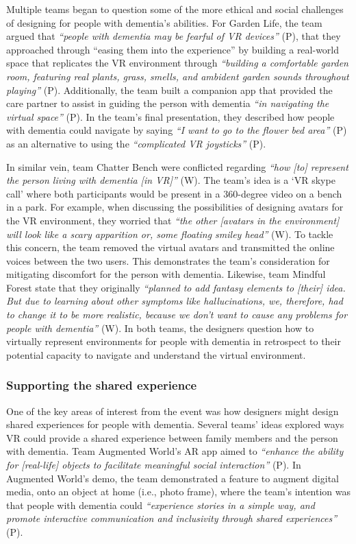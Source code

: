 Multiple teams began to question some of the more ethical and social challenges of designing for people with dementia’s abilities. For Garden Life, the team argued that \textit{``people with dementia may be fearful of VR devices''} (P), that they approached through “easing them into the experience” by building a real-world space that replicates the VR environment through \textit{``building a comfortable garden room, featuring real plants, grass, smells, and ambident garden sounds throughout playing''} (P). Additionally, the team built a companion app that provided the care partner to assist in guiding the person with dementia \textit{``in navigating the virtual space''} (P). In the team’s final presentation, they described how people with dementia could navigate by saying \textit{``I want to go to the flower bed area''} (P) as an alternative to using the \textit{``complicated VR joysticks'' }(P). 

In similar vein, team Chatter Bench were conflicted regarding \textit{``how [to] represent the person living with dementia [in VR]''} (W). The team's idea is a `VR skype call' where both participants would be present in a 360-degree video on a bench in a park. For example, when discussing the possibilities of designing avatars for the VR environment, they worried that \textit{``the other [avatars in the environment] will look like a scary apparition or, some floating smiley head''} (W). To tackle this concern, the team removed the virtual avatars and transmitted the online voices between the two users. This demonstrates the team’s consideration for mitigating discomfort for the person with dementia. Likewise, team Mindful Forest state that they originally \textit{``planned to add fantasy elements to [their] idea. But due to learning about other symptoms like hallucinations, we, therefore, had to change it to be more realistic, because we don't want to cause any problems for people with dementia''} (W). In both teams, the designers question how to virtually represent environments for people with dementia in retrospect to their potential capacity to navigate and understand the virtual environment. 

\subsubsection{Supporting the shared experience}
\label{ThemeThree:Subthemetwo}
One of the key areas of interest from the event was how designers might design shared experiences for people with dementia. Several teams’ ideas explored ways VR could provide a shared experience between family members and the person with dementia. Team Augmented World’s AR app aimed to \textit{``enhance the ability for [real-life] objects to facilitate meaningful social interaction''} (P). In Augmented World’s demo, the team demonstrated a feature to augment digital media, onto an object at home (i.e., photo frame), where the team’s intention was that people with dementia could \textit{``experience stories in a simple way, and promote interactive communication and inclusivity through shared experiences''} (P).

